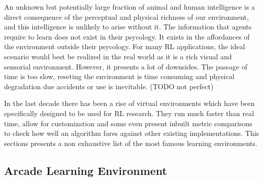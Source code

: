 An unknown but potentially large fraction of animal and human intelligence is a direct consequence of the perceptual and physical richness of our environment, and this intelligence is unlikely to arise without it. The information that agents require to learn does not exist in their psycology. It exists in the affordances of the environment outside their psycology. For many RL applications, the ideal scenario would best be realized in the real world as it is a rich visual and sensorial environment. However, it presents a lot of downsides. The passage of time is too slow, reseting the environment is time consuming and physical degradation due accidents or use is inevitable. (TODO not perfect)

In the last decade there has been a rise of virtual environments which have been specifically designed to be used for RL research. They run much faster than real time, allow for customization and some even present inbuilt metric comparisons to check how well an algorithm fares against other existing implementations. This sections presents a non exhaustive list of the most famous learning environments. 


\subsection{Arcade Learning Environment}

